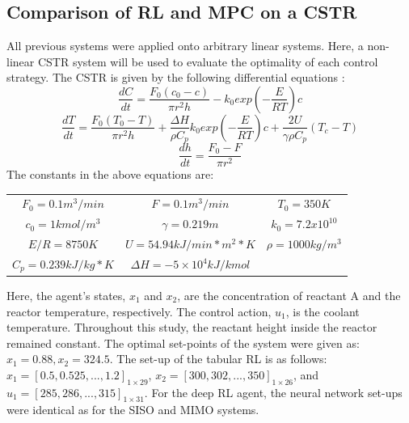 \subsection{Comparison of RL and MPC on a CSTR}
All previous systems were applied onto arbitrary linear systems. Here, a non-linear CSTR system will be used to evaluate the optimality of each control strategy. The CSTR is given by the following differential equations \cite{chem_eng}:
\begin{equation}
\dfrac{dC}{dt} = \dfrac{F_0(c_0 - c)}{\pi r^2 h} - k_0exp(-\dfrac{E}{RT})c
\end{equation}
\begin{equation}
\dfrac{dT}{dt} = \dfrac{F_0(T_0 - T)}{\pi r^2 h} + \dfrac{\Delta H}{\rho C_p} k_0 exp(-\dfrac{E}{RT})c + \dfrac{2U}{\gamma \rho C_p}(T_c - T)
\end{equation}
\begin{equation}
\dfrac{dh}{dt} = \dfrac{F_0 - F}{\pi r^2 }
\end{equation}
The constants in the above equations are: \\
\begin{table}[H]
\centering
\begin{tabular}{ccc}
$ F_0 = 0.1 m^3 / min$ & $ F = 0.1 m^3 / min $ & $ T_0 = 350 K $ \\ 
$c_0 = 1 kmol/m^3 $ & $\gamma = 0.219 m $	  & $k_0 = 7.2 x 10^{10} $ \\
$ E/R = 8750 K $ & $ U = 54.94 kJ/min*m^2*K $ & $ \rho = 1000 kg/m^3 $ \\
$C_p = 0.239 kJ/kg * K$ & $\Delta H = -5 \times 10^4 kJ/kmol$
\end{tabular}
\end{table}
Here, the agent's states, $x_1$ and $x_2$, are the concentration of reactant A and the reactor temperature, respectively.  The control action, $u_1$, is the coolant temperature. Throughout this study, the reactant height inside the reactor remained constant. The optimal set-points of the system were given as: $x_1 = 0.88, x_2 = 324.5$. The set-up of the tabular RL is as follows: $x_1 = [0.5, 0.525, ..., 1.2]_{1 \times 29}$, $x_2 = [300, 302, ..., 350]_{1 \times 26}$, and $u_1 = [285, 286, ..., 315]_{1 \times 31}$.  For the deep RL agent, the neural network set-ups were identical as for the SISO and MIMO systems.


